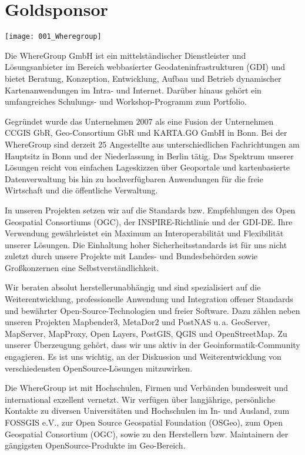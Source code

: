 \section*{Goldsponsor}
\begin{center}
	\texttt{[image: 001\_Wheregroup]}
\end{center}
Die WhereGroup GmbH ist ein mittelständischer Dienst\-leister und Lösungsanbieter im Bereich 
webbasierter Geodateninfrastrukturen (GDI) und bietet Beratung, Konzeption, Entwicklung, 
Aufbau und Betrieb dynamischer Kartenanwendungen im Intra- und Internet. Da\-rüber 
hinaus gehört ein umfangreiches Schulungs- und Workshop-Pro\-gramm zum Portfolio.

Gegründet wurde das Unternehmen 2007 als eine Fusion der Unternehmen CCGIS GbR, 
Geo-Consortium GbR und KARTA.GO GmbH in Bonn. Bei der WhereGroup sind derzeit 25 
Angestellte aus unterschiedlichen Fachrichtungen am Hauptsitz in Bonn und der Niederlassung in Berlin tätig. 
Das Spektrum unserer Lösungen reicht von einfachen Lageskizzen über Geoportale und 
kartenbasierte Datenverwaltung bis hin zu hochverfügbaren Anwendungen für die freie 
Wirtschaft und die öffentliche Verwaltung. 

In unseren Projekten setzen wir auf die Standards bzw. Empfehlungen des Open Geospatial 
Consortiums (OGC), der INSPIRE-Richtlinie und der GDI-DE. Ihre Verwendung gewährleistet 
ein Maximum an Interoperabilität und Flexibilität unserer Lösungen. Die Einhaltung hoher 
Sicherheitsstandards ist für uns nicht zuletzt durch unsere Projekte mit Landes- und 
Bundesbehörden sowie Großkonzernen eine Selbstverständlichkeit.

Wir beraten absolut herstellerunabhängig und sind spe\-zialisiert auf die Weiter\-ent\-wicklung, professionelle Anwendung 
und Integration offener Standards und bewährter Open-Source-Technologien und 
freier Software. Dazu zäh\-len neben unseren Projekten Mapbender3, MetaDor2 und PostNAS u.\,a. 
GeoServer, MapServer, Map\-Proxy, Open Lay\-ers, PostGIS, QGIS und OpenStreetMap.
Zu unserer Überzeugung gehört, dass wir uns aktiv in der Geoinfor\-matik-Community engagieren. 
Es ist uns wichtig, an der Diskussion und Weiterentwicklung von verschiedensten Open\-Source-Lösungen mitzuwirken.

Die WhereGroup ist mit Hochschulen, Firmen und Verbänden bundesweit und international exzellent 
vernetzt. Wir verfügen über langjährige, persönliche Kontakte zu diversen Universitäten und 
Hochschulen im In- und Ausland, zum FOSSGIS e.V., zur Open Source Geospatial Foundation (OSGeo), 
zum Open Geospatial Consortium (OGC), sowie zu den Herstellern bzw. Maintainern der gängigsten 
OpenSource-Produkte im Geo-Bereich.
